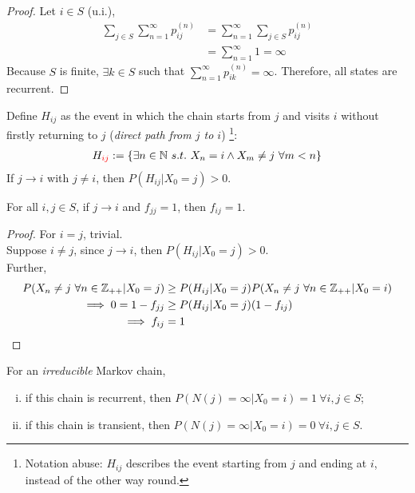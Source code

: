 \documentclass{article}
\newcommand{\upn}[0]{^{(n)}}
\begin{document}
    \begin{proof}
    	Let $i \in S$ (u.i.),
    	\begin{align}
    		\sum_{j \in S} \sum_{n=1}^\infty p_{ij}\upn
    		&= \sum_{n=1}^\infty \sum_{j \in S} p_{ij}\upn \\
    		&= \sum_{n=1}^\infty 1 = \infty
    	\end{align}
    	Because $S$ is finite, $\exists k \in S$ such that $\sum_{n=1}^\infty p_{ik}\upn = \infty$. Therefore, all states are recurrent.
    \end{proof}
    
    \begin{theorem}
    	Define $H_{ij}$ as the event in which the chain starts from $j$ and visits $i$ without firstly returning to $j$ (\emph{direct path from $j$ to $i$}) \footnote{Notation abuse: $H_{ij}$ describes the event starting from $j$ and ending at $i$, instead of the other way round.}:
    	\begin{align}
    		H_{\textcolor{red}{ij}} := \{\exists n \in \mathbb{N}\ s.t.\ X_n = i \land X_m \neq j\ \forall m < n\}
    	\end{align}
    	If $j \to i$ with $j \neq i$, then $P(H_{ij}|X_0=j) > 0$.
    \end{theorem}
    
    \begin{theorem}[f-Lemma]
    	For all $i, j \in S$, if $j \to i$ and $f_{jj} = 1$, then $f_{ij} = 1$.
    \end{theorem}
    
    \begin{proof}
    	For $i = j$, trivial. \\
    	Suppose $i \neq j$, since $j \to i$, then $P(H_{ij}|X_0=j)> 0$. \\
    	Further,
    	\begin{align}
    		P(X_n \neq j\ \forall n \in \mathbb{Z}_{++} | X_0=j)
    		&\geq P(H_{ij}|X_0=j) P(X_n \neq j\ \forall n \in \mathbb{Z}_{++} | X_0=i)\\
    		\implies 0 = 1 - f_{jj} &\geq P(H_{ij}|X_0=j) (1 - f_{ij}) \\
    		\implies f_{ij} &= 1
    	\end{align}
    \end{proof}
    
    \begin{theorem}
    	For an \emph{irreducible} Markov chain,
    	\begin{enumerate}[(i)]
    		\item if this chain is recurrent, then $P(N(j)=\infty|X_0=i)=1\ \forall i, j \in S$;
    		\item if this chain is transient, then $P(N(j)=\infty|X_0=i)=0\ \forall i, j \in S$.
    	\end{enumerate}
    \end{theorem}
    
\end{document}
